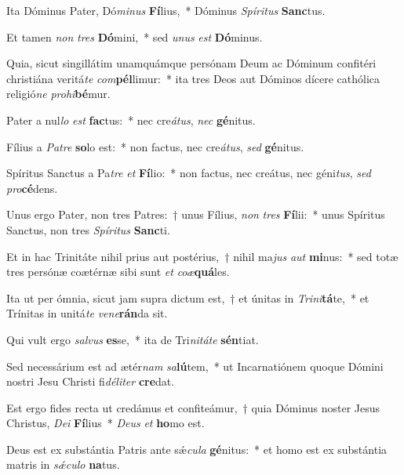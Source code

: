 \item Ita Dóminus Pater, Dó\textit{mi}\textit{nus} \textbf{Fí}lius,~* Dóminus \textit{Spí}\textit{ri}\textit{tus} \textbf{Sanc}tus.
\item Et tamen \textit{non} \textit{tres} \textbf{Dó}mini,~* sed \textit{u}\textit{nus} \textit{est} \textbf{Dó}minus.
\item Quia, sicut singillátim unamquámque persónam Deum ac Dóminum confitéri christiána veritá\textit{te} \textit{com}\textbf{pél}limur:~* ita tres Deos aut Dóminos dícere cathólica religió\textit{ne} \textit{pro}\textit{hi}\textbf{bé}mur.
\item Pater a nul\textit{lo} \textit{est} \textbf{fac}tus:~* nec cre\textit{á}\textit{tus}, \textit{nec} \textbf{gé}nitus.
\item Fílius a \textit{Pa}\textit{tre} \textbf{so}lo est:~* non factus, nec cre\textit{á}\textit{tus}, \textit{sed} \textbf{gé}nitus.
\item Spíritus Sanctus a Pa\textit{tre} \textit{et} \textbf{Fí}lio:~* non factus, nec creátus, nec géni\textit{tus}, \textit{sed} \textit{pro}\textbf{cé}dens.
\item Unus ergo Pater, non tres Patres:~† unus Fílius, \textit{non} \textit{tres} \textbf{Fí}lii:~* unus Spíritus Sanctus, non tres \textit{Spí}\textit{ri}\textit{tus} \textbf{Sanc}ti.
\item Et in hac Trinitáte nihil prius aut postérius,~† nihil ma\textit{jus} \textit{aut} \textbf{mi}nus:~* sed totæ tres persónæ coætérnæ sibi sunt \textit{et} \textit{co}\textit{æ}\textbf{quá}les.
\item Ita ut per ómnia, sicut jam supra dictum est,~† et únitas in \textit{Tri}\textit{ni}\textbf{tá}te,~* et Trínitas in unitá\textit{te} \textit{ve}\textit{ne}\textbf{rán}da sit.
\item Qui vult ergo \textit{sal}\textit{vus} \textbf{es}se,~* ita de Tri\textit{ni}\textit{tá}\textit{te} \textbf{sén}tiat.
\item Sed necessárium est ad ætér\textit{nam} \textit{sa}\textbf{lú}tem,~* ut Incarnatiónem quoque Dómini nostri Jesu Christi fi\textit{dé}\textit{li}\textit{ter} \textbf{cre}dat.
\item Est ergo fides recta ut credámus et confiteámur,~† quia Dóminus noster Jesus Christus, \textit{De}\textit{i} \textbf{Fí}lius~* \textit{De}\textit{us} \textit{et} \textbf{ho}mo est.
\item Deus est ex substántia Patris ante sǽ\textit{cu}\textit{la} \textbf{gé}nitus:~* et homo est ex substántia matris in \textit{sǽ}\textit{cu}\textit{lo} \textbf{na}tus.
